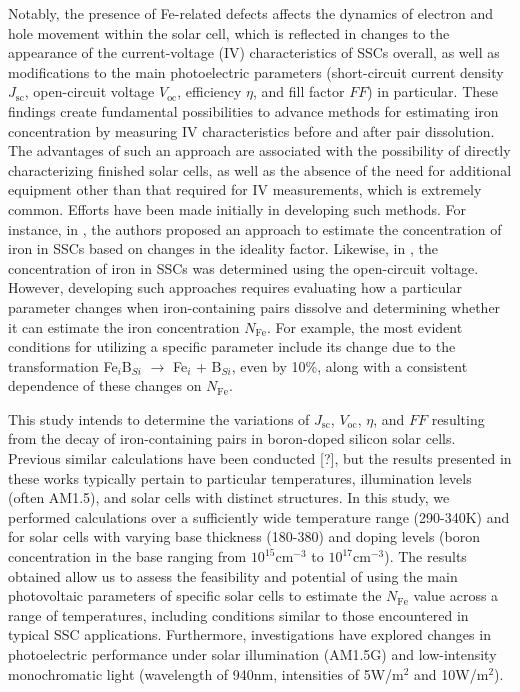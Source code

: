 \documentclass[a4paper,fleqn]{cas-sc}
\begin{document}
Notably, the presence of Fe-related defects affects the dynamics of electron and hole movement within the solar cell, which is reflected in changes to the appearance of the current-voltage (IV) characteristics of SSCs overall, as well as modifications to the main photoelectric parameters (short-circuit current density $J$$\mathrm{_{sc}}$, open-circuit voltage $V$$\mathrm{_{oc}}$, efficiency $\eta$, and fill factor $FF$) in particular. These findings create fundamental possibilities to advance methods for estimating iron concentration by measuring IV characteristics before and after pair dissolution. The advantages of such an approach are associated with the possibility of directly characterizing finished solar cells, as well as the absence of the need for additional equipment other than that required for IV measurements, which is extremely common. Efforts have been made initially in developing such methods. For instance, in \cite{Olikh2019}, the authors proposed an approach to estimate the concentration of iron in SSCs based on changes in the ideality factor. Likewise, in \cite{Herguth2022}, the concentration of iron in SSCs was determined using the open-circuit voltage. However, developing such approaches requires evaluating how a particular parameter changes when iron-containing pairs dissolve and determining whether it can estimate the iron concentration $N$$\mathrm{_{Fe}}$. For example, the most evident conditions for utilizing a specific parameter include its change due to the transformation  Fe$_i$B$_{Si}$ $\rightarrow$ Fe$_i$ + B$_{Si}$, even by 10\%, along with a consistent dependence of these changes on $N$$\mathrm{_{Fe}}$.


This study intends to determine the variations of $J$$\mathrm{_{sc}}$, $V$$\mathrm{_{oc}}$, $\eta$, and $FF$ resulting from the decay of iron-containing pairs in boron-doped silicon solar cells. Previous similar calculations have been conducted [?], but the results presented in these works typically pertain to particular temperatures, illumination levels (often AM1.5), and solar cells with distinct structures. In this study, we performed calculations over a sufficiently wide temperature range (290-340$\mathrm{K}$) and for solar cells with varying base thickness (180-380\textnormal{\textmu}) and doping levels (boron concentration in the base ranging from $\mathrm{10}^{15}$$\mathrm{cm}^{-3}$ to $\mathrm{10}^{17}$$\mathrm{cm}^{-3}$). The results obtained allow us to assess the feasibility and potential of using the main photovoltaic parameters of specific solar cells to estimate the $N$$\mathrm{_{Fe}}$ value across a range of temperatures, including conditions similar to those encountered in typical SSC applications. Furthermore, investigations have explored changes in photoelectric performance under solar illumination (AM1.5G) and low-intensity monochromatic light (wavelength of 940$\mathrm{nm}$, intensities of 5W/$\mathrm{m}^{2}$ and 10W/$\mathrm{m}^{2}$).
\end{document}
